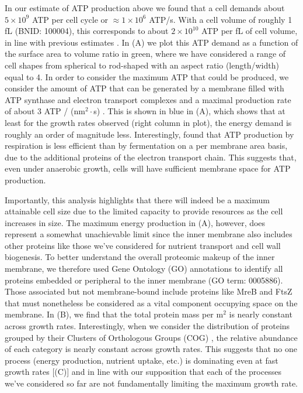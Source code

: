 In our estimate of ATP production above we found that a cell demands about $5
\times 10^9$ ATP per cell cycle or $\approx 1 \times 10^6$ ATP/s. With a cell
volume of roughly 1 fL (BNID: 100004), this corresponds to about $2 \times
10^{10}$ ATP per fL of cell volume, in line with previous estimates
\citep{stouthamer1977, szenk2017}. In (A) we plot this ATP
demand as a function of the surface area to volume ratio in green, where we have
considered a range of cell shapes from spherical to rod-shaped with an aspect
ratio (length/width) equal to 4. In order to consider the maximum ATP that could
be produced, we consider the amount of ATP that can be generated by a membrane
filled with ATP synthase and electron transport complexes and a maximal
production rate of about 3 ATP / (nm$^2 \cdot$s) \citep{szenk2017}. This is
shown in blue in (A), which shows that at least for the
growth rates observed (right column in plot), the energy demand is roughly an
order of magnitude less. Interestingly, \cite{szenk2017} found that ATP
production by respiration is less efficient than by fermentation on a per
membrane area basis, due to the additional proteins of the electron transport
chain. This suggests that, even under anaerobic growth, cells will have
sufficient membrane space for ATP production.

Importantly, this analysis highlights that there will indeed be a maximum
attainable cell size due to the limited capacity to provide resources as the
cell increases in size. The maximum energy production in
(A), however, does represent a somewhat unachievable limit
since the inner membrane also includes other proteins like those we've
considered for nutrient transport and cell wall biogenesis. To better understand
the overall proteomic makeup of the inner membrane, we therefore used Gene
Ontology (GO) annotations \citep{ashburner2000, thegeneOntologyconsortium2018}
to identify all proteins embedded or peripheral to the inner membrane (GO term:
0005886). Those associated but not membrane-bound include proteins like MreB and
FtsZ that must nonetheless be considered as a vital component occupying space on
the membrane. In (B), we find that the total protein mass
per \textmu m$^2$ is nearly constant across growth rates. Interestingly, when we
consider the distribution of proteins grouped by their Clusters of Orthologous
Groups (COG) \citep{tatusov2000}, the relative abundance of each category is
nearly constant across growth rates. This suggests that no one process (energy
production, nutrient uptake, etc.) is dominating even at fast growth rates
[(C)] and in line with our supposition that each of the
processes we've considered so far are not fundamentally limiting the maximum
growth rate.


